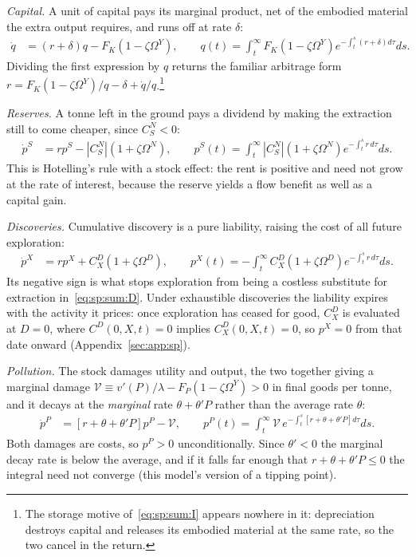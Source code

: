 \emph{Capital.} A unit of capital pays its marginal product, net of the embodied material the extra output requires, and runs off at rate $\delta$:
\begin{align}
\dot q &= \left(r+\delta\right)q-F_K\left(1-\zeta\Omega^Y\right),
\qquad
q\left(t\right)=\int_t^\infty F_K\left(1-\zeta\Omega^Y\right)e^{-\int_t^s\left(r+\delta\right)d\tau}ds .
\label{eq:sp:sum:K}
\end{align}
Dividing the first expression by $q$ returns the familiar arbitrage form $r=F_K\left(1-\zeta\Omega^Y\right)/q-\delta+\dot q/q$.\footnote{The storage motive of~\eqref{eq:sp:sum:I} appears nowhere in it: depreciation destroys capital and releases its embodied material at the same rate, so the two cancel in the return.}

\emph{Reserves.} A tonne left in the ground pays a dividend by making the extraction still to come cheaper, since $C^N_S<0$:
\begin{align}
\dot p^S &= rp^S-\left|C^N_S\right|\left(1+\zeta\Omega^N\right),
\qquad
p^S\left(t\right)=\int_t^\infty\left|C^N_S\right|\left(1+\zeta\Omega^N\right)e^{-\int_t^s r\,d\tau}ds .
\label{eq:sp:sum:S}
\end{align}
This is Hotelling's rule with a stock effect: the rent is positive and need not grow at the rate of interest, because the reserve yields a flow benefit as well as a capital gain.

\emph{Discoveries.} Cumulative discovery is a pure liability, raising the cost of all future exploration:
\begin{align}
\dot p^X &= rp^X+C^D_X\left(1+\zeta\Omega^D\right),
\qquad
p^X\left(t\right)=-\int_t^\infty C^D_X\left(1+\zeta\Omega^D\right)e^{-\int_t^s r\,d\tau}ds .
\label{eq:sp:sum:X}
\end{align}
Its negative sign is what stops exploration from being a costless substitute for extraction in~\eqref{eq:sp:sum:D}. Under exhaustible discoveries the liability expires with the activity it prices: once exploration has ceased for good, $C^D_X$ is evaluated at $D=0$, where $C^D\left(0,X,t\right)=0$ implies $C^D_X\left(0,X,t\right)=0$, so $p^X=0$ from that date onward (Appendix~\ref{sec:app:sp}).

\emph{Pollution.} The stock damages utility and output, the two together giving a marginal damage $\mathcal V\equiv v'\left(P\right)/\lambda-F_P\left(1-\zeta\Omega^Y\right)>0$ in final goods per tonne, and it decays at the \emph{marginal} rate $\theta+\theta'P$ rather than the average rate $\theta$:
\begin{align}
\dot p^P &= \left[r+\theta+\theta'P\right]p^P-\mathcal V,
\qquad
p^P\left(t\right)=\int_t^\infty\mathcal V\,e^{-\int_t^s\left[r+\theta+\theta'P\right]d\tau}ds .
\label{eq:sp:sum:P}
\end{align}
Both damages are costs, so $p^P>0$ unconditionally. Since $\theta'<0$ the marginal decay rate is below the average, and if it falls far enough that $r+\theta+\theta'P\le0$ the integral need not converge (this model's version of a tipping point).

